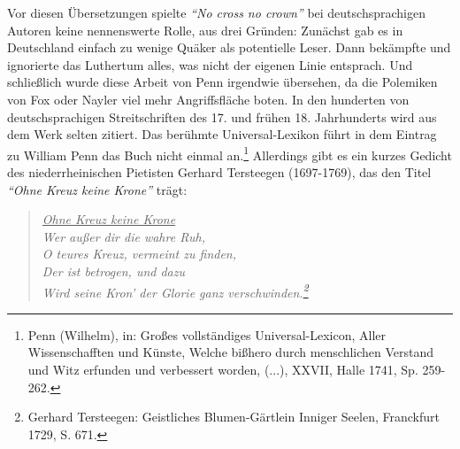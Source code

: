 \medskip

Vor diesen Übersetzungen spielte \textit{"`No cross no crown"'} bei deutschsprachigen
Autoren keine nennenswerte Rolle, aus drei Gründen: Zunächst gab es in Deutschland
einfach zu wenige Quäker als potentielle Leser. Dann bekämpfte und ignorierte das Luthertum alles,
was nicht der eigenen Linie entsprach. Und schließlich wurde diese Arbeit von Penn irgendwie übersehen,
da die Polemiken von Fox oder Nayler viel mehr Angriffsfläche boten. In den hunderten von
deutschsprachigen Streitschriften des 17.
und frühen 18. Jahrhunderts wird aus dem Werk selten zitiert. Das berühmte
Universal-Lexikon führt in dem Eintrag zu William Penn das Buch nicht einmal
an.\footnote{Penn (Wilhelm), in: Großes vollständiges Universal-Lexicon, Aller
Wissenschafften und Künste, Welche bißhero durch menschlichen Verstand und Witz
erfunden und verbessert worden, (...), XXVII, Halle 1741, Sp. 259-262.}
Allerdings gibt es ein kurzes Gedicht des niederrheinischen Pietisten Gerhard
Tersteegen (1697-1769), das den Titel \textit{"`Ohne Kreuz keine Krone"'} trägt:

\begin{verse}
\textit{
\underline{Ohne Kreuz keine Krone}\\
Wer außer dir die wahre Ruh,\\
O teures Kreuz, vermeint zu finden,\\
Der ist betrogen, und dazu\\
Wird seine Kron’ der Glorie ganz verschwinden.\footnote{Gerhard Tersteegen:
Geistliches Blumen-Gärtlein Inniger Seelen, Franckfurt
1729, S. 671.}}
\end{verse}

